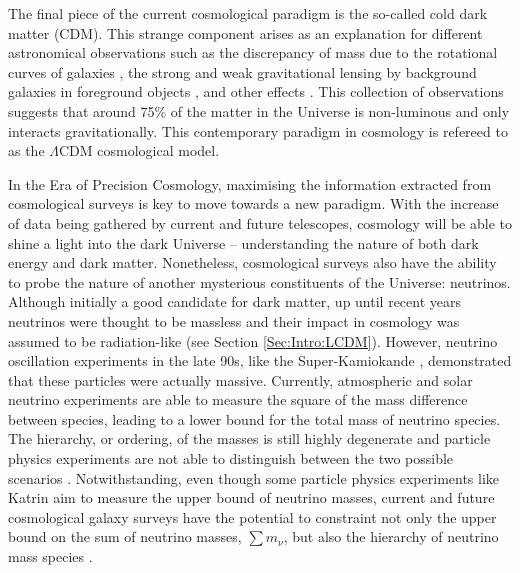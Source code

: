 \qquad The final piece of the current cosmological paradigm is the so-called cold dark matter (CDM). This strange component arises as an explanation for different astronomical observations such as the discrepancy of mass due to the rotational curves of galaxies \citep{1970Rubin,1973RobersRots}, the strong and weak gravitational lensing by background galaxies in foreground objects \citep{2006BulletCluster}, and other effects \citep[see][for a detailed review]{DarkMatterReview1993}. This collection of observations suggests that around 75\% of the matter in the Universe is non-luminous and only interacts gravitationally. This contemporary paradigm in cosmology is refereed to as the $\Lambda$CDM cosmological model.

\qquad In the Era of Precision Cosmology, maximising the information extracted from cosmological surveys is key to move towards a new paradigm. With the increase of data being gathered by current and future telescopes, cosmology will be able to shine a light into the dark Universe -- understanding the nature of both dark energy and dark matter. Nonetheless, cosmological surveys also have the ability to probe the nature of another mysterious constituents of the Universe: neutrinos. Although initially a good candidate for dark matter, up until recent years neutrinos were thought to be massless and their impact in cosmology was assumed to be radiation-like (see Section \ref{Sec:Intro:LCDM}). However, neutrino oscillation experiments in the late 90s, like the Super-Kamiokande \citep{Kamiokande1998}, demonstrated that these particles were actually massive. Currently, atmospheric and solar neutrino experiments are able to measure the square of the mass difference between species, leading to a lower bound for the total mass of neutrino species. The hierarchy, or ordering, of the masses is still highly degenerate and particle physics experiments are not able to distinguish between the two possible scenarios \citep{2014Gonzalez-GarciaNeutrino}. Notwithstanding, even though some particle physics experiments like Katrin \citep{2018Katrin} aim to measure the upper bound of neutrino masses, current and future cosmological galaxy surveys have the potential to constraint not only the upper bound on the sum of neutrino masses, $\sum m_{\nu}$, but also the hierarchy of neutrino mass species \citep{2003HannestadNeutrino, 2007FBA,2016Hannestad}.

